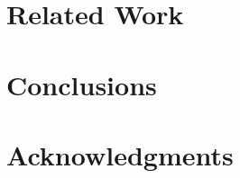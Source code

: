 %	
%		
%		
%		
%		
%		
%		
%		
\section{Related Work}
		
\section{Conclusions}
		

\section*{Acknowledgments}
	


